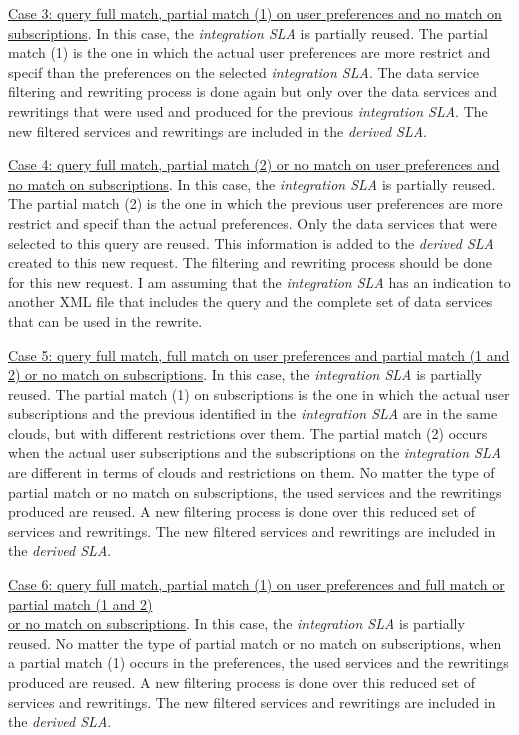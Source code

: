 \documentclass[10pt,a4paper,final]{report}
\begin{document}
\noindent \underline{Case 3: query full match, partial match (1) on user preferences and no match on subscriptions}. In this case, the \textsl{integration SLA} is partially reused. The partial match (1) is the one in which the actual user preferences are more restrict and specif than the preferences on the selected \textsl{integration SLA}. The data service filtering and rewriting process is done again but only over the data services and rewritings that were used and produced for the previous \textsl{integration SLA}. The new filtered services and rewritings are included in the \textsl{derived SLA}.
\bigskip

\noindent \underline{Case 4: query full match, partial match (2) or no match on user preferences and no match on subscriptions}. In this case, the \textsl{integration SLA} is partially reused. The partial match (2) is the one in which the previous user preferences are more restrict and specif than the actual preferences. Only the data services that were selected to this query are reused. This information is added to the \textsl{derived SLA} created to this new request. The filtering and rewriting process should be done for this new request. I am assuming that the \textsl{integration SLA} has an indication to another XML file that includes the query and the complete set of data services that can be used in the rewrite.
\bigskip

\noindent \underline{Case 5: query full match, full match on user preferences and partial match (1 and 2) or no match on subscriptions}. In this case, the \textsl{integration SLA} is partially reused. The partial match (1) on subscriptions is the one in which the actual user subscriptions and the previous identified in the \textsl{integration SLA} are in the same clouds, but with different restrictions over them. The partial match (2) occurs when the actual user subscriptions and the subscriptions on the \textsl{integration SLA} are different in terms of clouds and restrictions on them. No matter the type of partial match or no match on subscriptions, the used services and the rewritings produced are reused. A new filtering process is done over this reduced set of services and rewritings. The new filtered services and rewritings are included in the \textsl{derived SLA}.
\bigskip

\noindent \underline{Case 6: query full match, partial match (1) on user preferences and full match or partial match (1 and 2)} \\ \underline{or no match on subscriptions}. In this case, the \textsl{integration SLA} is partially reused.  No matter the type of partial match or no match on subscriptions, when a partial match (1) occurs in the preferences, the used services and the rewritings produced are reused. A new filtering process is done over this reduced set of services and rewritings. The new filtered services and rewritings are included in the \textsl{derived SLA}.
\bigskip
\end{document}

